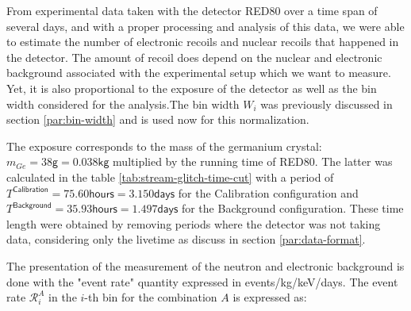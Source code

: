 From experimental data taken with the detector RED80 over a time span of several days, and with a proper processing and analysis of this data, we were able to estimate the number of electronic recoils and nuclear recoils that happened in the detector.
The amount of recoil does depend on the nuclear and electronic background associated with the experimental setup which we want to measure. Yet, it is also proportional to the exposure of the detector as well as the bin width considered for the analysis.The bin width $W_i$ was previously discussed in section \ref{par:bin-width} and is used now for this normalization.

The exposure corresponds to the mass of the germanium crystal: $m_{Ge} = 38 \textsf{g} = 0.038 \textsf{kg} $ multiplied by the running time of RED80. The latter was calculated in the table \ref{tab:stream-glitch-time-cut} with a period of $T^{\textsf{Calibration}} = 75.60 \textsf{hours} = 3.150 \textsf{days}$ for the Calibration configuration and $T^{\textsf{Background}} = 35.93 \textsf{hours} = 1.497 \textsf{days}$ for the Background configuration. These time length were obtained by removing periods where the detector was not taking data, considering only the livetime as discuss in section \ref{par:data-format}. 


The presentation of the measurement of the neutron and electronic background is done with the "event rate" quantity expressed in events/kg/keV/days. The event rate $\mathcal{R}_i^A$ in the $i$-th bin for the combination $A$ is expressed as:

